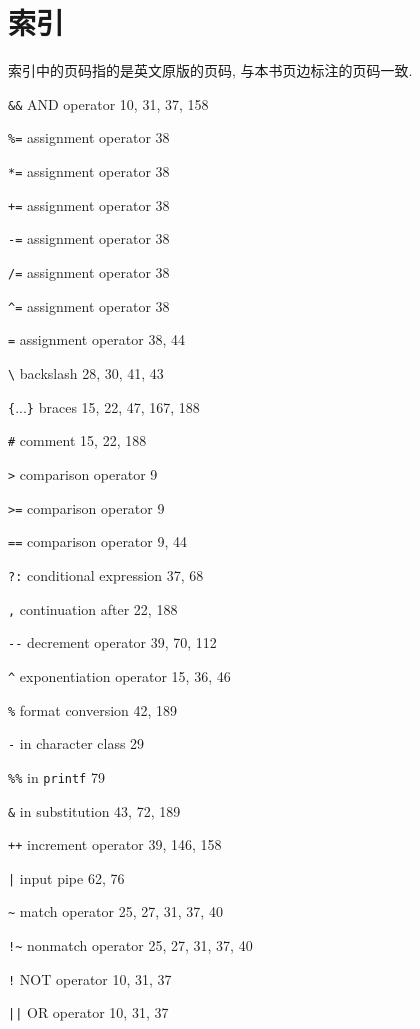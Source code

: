 \chapter{索引}
\label{chap:index}

索引中的页码指的是英文原版的页码, 与本书页边标注的页码一致.

\begin{multicols}{3}
\footnotesize
\verb'&&' AND operator 10, 31, 37, 158

\verb'%=' assignment operator 38

\verb'*=' assignment operator 38

\verb'+=' assignment operator 38

\verb'-=' assignment operator 38

\verb'/=' assignment operator 38

\verb'^=' assignment operator 38

\verb'=' assignment operator 38, 44

\verb'\' backslash 28, 30, 41, 43

\verb'{'...\verb'}' braces 15, 22, 47, 167, 188

\verb'#' comment 15, 22, 188

\verb'>' comparison operator 9

\verb'>=' comparison operator 9

\verb'==' comparison operator 9, 44

\verb'?:' conditional expression 37, 68

\verb',' continuation after 22, 188

\verb'--' decrement operator 39, 70, 112

\verb'^' exponentiation operator 15, 36, 46

\verb'%' format conversion 42, 189

\verb'-' in character class 29

\verb'%%' in \verb'printf' 79

\verb'&' in substitution 43, 72, 189

\verb'++' increment operator 39, 146, 158

\verb'|' input pipe 62, 76

\verb'~' match operator 25, 27, 31, 37, 40

\verb'!~' nonmatch operator 25, 27, 31, 37, 40

\verb'!' NOT operator 10, 31, 37

\verb'||' OR operator 10, 31, 37


\end{multicols}
